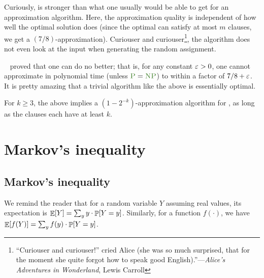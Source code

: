 Curiously,  is stronger than what one usually
would be able to get for an approximation algorithm. Here, the
approximation quality is independent of how well the optimal solution
does (since the optimal can satisfy at most $m$ clauses, we get a
$(7/8)$-approximation).  Curious{}er and
curious{}er\footnote{``Curious{}er and curious{}er!''  cried Alice (she
   was so much surprised, that for the moment she quite forgot how to
   speak good English).''---\emph{Alice's Adventures in Wonderland},
   Lewis Carroll}, the algorithm does not even look at the input when
generating the random assignment.


\Hastad~\cite{h-soir-01} proved that one can do no better; that is, for
any constant ${\varepsilon} > 0$, one cannot approximate  in
polynomial time (unless $\POLYT = \NP$) to within a factor of
$7/8 + {\varepsilon}$. It is pretty amazing that a trivial algorithm like the above
is essentially optimal.

\begin{remark}
    For $k \geq 3$, the above implies a $(1-2^{-k})$-approximation algorithm
    for , as long as the clauses each have at least
    $k$.
\end{remark}



\section{Markov's inequality}

\subsection{Markov's inequality}

We remind the reader that for a random variable $Y$ assuming real values,
its {expectation} is $ \Ex {Y} = \sum_{y} y \cdot \Prob{ Y=y}$.  Similarly, for
a function $f(\cdot)$, we have $\Ex{f(Y)} = \sum_{y} f(y) \cdot \Prob{Y=y}$.

